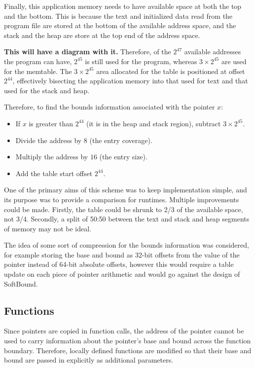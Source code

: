 Finally, this application memory needs to have available space at both the top and the bottom.
This is because the text and initialized data read from the program file are stored at the bottom of the available address space, and the stack and the heap are store at the top end of the address space.

\textbf{This will have a diagram with it.} Therefore, of the $2^{47}$ available addresses the program can have, $2^{45}$ is still used for the program, whereas $3\times 2^{45}$ are used for the memtable.
The $3\times 2^{45}$ area allocated for the table is positioned at offset $2^{44}$, effectively bisecting the application memory into that used for text and that used for the stack and heap.

Therefore, to find the bounds information associated with the pointer $x$:

\begin{itemize}
\item If $x$ is greater than $2^{44}$ (it is in the heap and stack region), subtract $3\times 2^{45}$.
\item Divide the address by $8$ (the entry coverage).
\item Multiply the address by $16$ (the entry size).
\item Add the table start offset $2^{44}$.
\end{itemize}

One of the primary aims of this scheme was to keep implementation simple, and its purpose was to provide a comparison for runtimes.
Multiple improvements could be made.
Firstly, the table could be shrunk to 2/3 of the available space, not 3/4.
Secondly, a split of 50:50 between the text and stack and heap segments of memory may not be ideal.

The idea of some sort of compression for the bounds information was considered, for example storing the base and bound as 32-bit offsets from the value of the pointer instead of 64-bit absolute offsets, however this would require a table update on each piece of pointer arithmetic and would go against the design of SoftBound.
\subsection{Functions}

Since pointers are copied in function calls, the address of the pointer cannot be used to carry information about the pointer's base and bound across the function boundary.
Therefore, locally defined functions are modified so that their base and bound are passed in explicitly as additional parameters.


